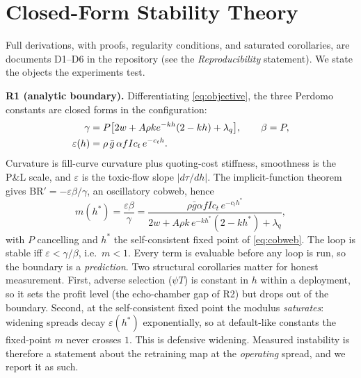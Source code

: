 \documentclass[sigconf]{acmart}
\newcommand{\eps}{\varepsilon}
\newcommand{\BR}{\mathrm{BR}}
\newcommand{\gbar}{\bar{g}}
\begin{document}
\section{Closed-Form Stability Theory}
\label{sec:theory}

Full derivations, with proofs, regularity conditions, and saturated
corollaries, are documents D1--D6 in the repository (see the
\emph{Reproducibility} statement). We state the objects the experiments
test.

\textbf{R1 (analytic boundary).} Differentiating \eqref{eq:objective}, the
three Perdomo constants are closed forms in the configuration:
\begin{align}
\gamma&=P\big[2w+A\rho k e^{-kh}(2-kh)+\lambda_q\big],\qquad \beta=P,
\notag\\
\eps(h)&=\rho\,\gbar\,\alpha f I c_t\,e^{-c_t h}.
\label{eq:constants}
\end{align}
Curvature is fill-curve curvature plus quoting-cost stiffness, smoothness is
the P\&L scale, and $\eps$ is the toxic-flow slope $|d\tau/dh|$. The
implicit-function theorem gives $\BR'=-\eps\beta/\gamma$, an oscillatory
cobweb, hence
\begin{equation}
m(h^*)=\frac{\eps\beta}{\gamma}
=\frac{\rho\gbar\alpha f I c_t\,e^{-c_t h^*}}
       {2w+A\rho k\,e^{-k h^*}(2-k h^*)+\lambda_q},
\label{eq:modulus}
\end{equation}
with $P$ cancelling and $h^*$ the self-consistent fixed point of
\eqref{eq:cobweb}. The loop is stable iff $\eps<\gamma/\beta$, i.e.\ $m<1$.
Every term is evaluable before any loop is run, so the boundary is a
\emph{prediction}. Two structural corollaries matter for honest measurement.
First, adverse selection ($\psi T$) is constant in $h$ within a deployment,
so it sets the profit level (the echo-chamber gap of R2) but drops out of
the boundary. Second, at the self-consistent fixed point the modulus
\emph{saturates}: widening spreads decay $\eps(h^*)$ exponentially, so at
default-like constants the fixed-point $m$ never crosses $1$. This is
defensive widening. Measured instability is therefore a statement about the
retraining map at the \emph{operating} spread, and we report it as such.
\end{document}
